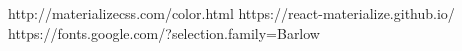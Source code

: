 http://materializecss.com/color.html
https://react-materialize.github.io/
https://fonts.google.com/?selection.family=Barlow   
